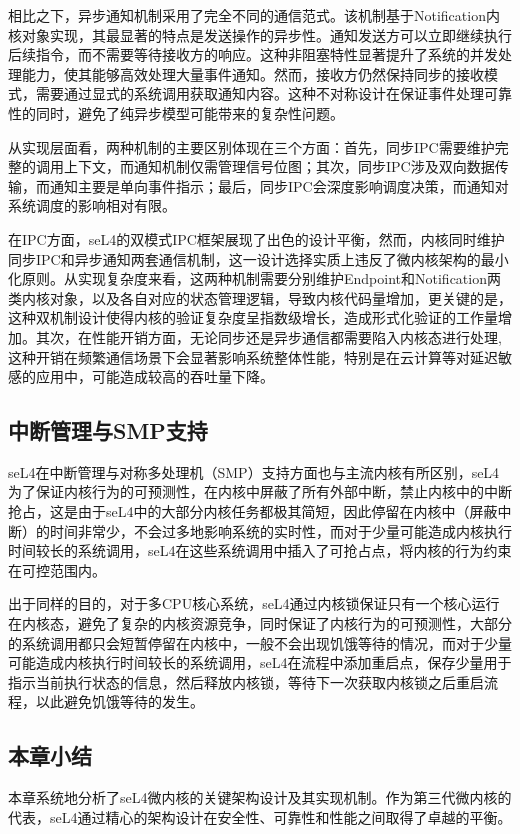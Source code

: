 相比之下，异步通知机制采用了完全不同的通信范式。该机制基于Notification内核对象实现，其最显著的特点是发送操作的异步性。通知发送方可以立即继续执行后续指令，而不需要等待接收方的响应。这种非阻塞特性显著提升了系统的并发处理能力，使其能够高效处理大量事件通知。然而，接收方仍然保持同步的接收模式，需要通过显式的系统调用获取通知内容。这种不对称设计在保证事件处理可靠性的同时，避免了纯异步模型可能带来的复杂性问题。

从实现层面看，两种机制的主要区别体现在三个方面：首先，同步IPC需要维护完整的调用上下文，而通知机制仅需管理信号位图；其次，同步IPC涉及双向数据传输，而通知主要是单向事件指示；最后，同步IPC会深度影响调度决策，而通知对系统调度的影响相对有限。

在IPC方面，seL4的双模式IPC框架展现了出色的设计平衡，然而，内核同时维护同步IPC和异步通知两套通信机制，这一设计选择实质上违反了微内核架构的最小化原则。从实现复杂度来看，这两种机制需要分别维护Endpoint和Notification两类内核对象，以及各自对应的状态管理逻辑，导致内核代码量增加，更关键的是，这种双机制设计使得内核的验证复杂度呈指数级增长，造成形式化验证的工作量增加。其次，在性能开销方面，无论同步还是异步通信都需要陷入内核态进行处理,这种开销在频繁通信场景下会显著影响系统整体性能，特别是在云计算等对延迟敏感的应用中，可能造成较高的吞吐量下降。

\subsection{中断管理与SMP支持}
seL4在中断管理与对称多处理机（SMP）支持方面也与主流内核有所区别，seL4为了保证内核行为的可预测性，在内核中屏蔽了所有外部中断，禁止内核中的中断抢占，这是由于seL4中的大部分内核任务都极其简短，因此停留在内核中（屏蔽中断）的时间非常少，不会过多地影响系统的实时性，而对于少量可能造成内核执行时间较长的系统调用，seL4在这些系统调用中插入了可抢占点，将内核的行为约束在可控范围内。

出于同样的目的，对于多CPU核心系统，seL4通过内核锁保证只有一个核心运行在内核态\cite{peters2015microkernel}，避免了复杂的内核资源竞争，同时保证了内核行为的可预测性，大部分的系统调用都只会短暂停留在内核中，一般不会出现饥饿等待的情况，而对于少量可能造成内核执行时间较长的系统调用，seL4在流程中添加重启点，保存少量用于指示当前执行状态的信息，然后释放内核锁，等待下一次获取内核锁之后重启流程，以此避免饥饿等待的发生。

\subsection{本章小结}
本章系统地分析了seL4微内核的关键架构设计及其实现机制。作为第三代微内核的代表，seL4通过精心的架构设计在安全性、可靠性和性能之间取得了卓越的平衡。

